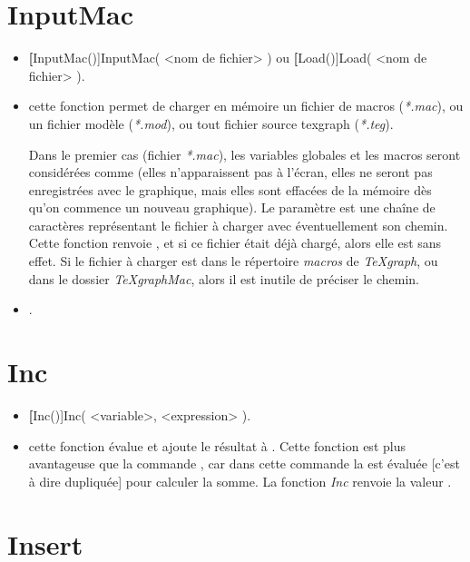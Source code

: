 \section{InputMac}\label{cmdInputMac}

\begin{itemize}
 \item \util \textbf[InputMac()]{InputMac( <nom de fichier> )} ou \textbf[Load()]{Load( <nom de fichier> )}.
 \item \desc cette fonction permet de charger en mémoire un fichier de macros (\textit{*.mac}), ou un fichier modèle (\textit{*.mod}), ou tout fichier source texgraph (\textit{*.teg}).

 Dans le premier cas (fichier \textit{*.mac}), les variables globales et les macros seront considérées comme  (elles n'apparaissent pas à l'écran, elles ne seront pas enregistrées avec le graphique, mais elles sont effacées de la mémoire dès qu'on commence un nouveau graphique). Le paramètre  est une chaîne de caractères représentant le fichier à charger avec éventuellement son chemin. Cette fonction renvoie \Nil, et si ce fichier était déjà chargé, alors elle est sans effet. Si le fichier à charger est dans le répertoire \textit{macros} de \textit{TeXgraph}, ou dans le dossier \textit{TeXgraphMac}, alors il est inutile de préciser le chemin. 
 \item \exem {}.
\end{itemize}

\section{Inc}\label{cmdInc}

\begin{itemize}
 \item \util \textbf[Inc()]{Inc( <variable>, <expression> )}. 
 \item \desc cette fonction évalue  et ajoute le résultat à . Cette fonction est plus avantageuse que la commande , car dans cette commande la  est évaluée [c'est à dire dupliquée] pour calculer la somme. La fonction \textsl{Inc} renvoie la valeur \Nil. 
\end{itemize}


\section{Insert}\label{cmdInsert}

